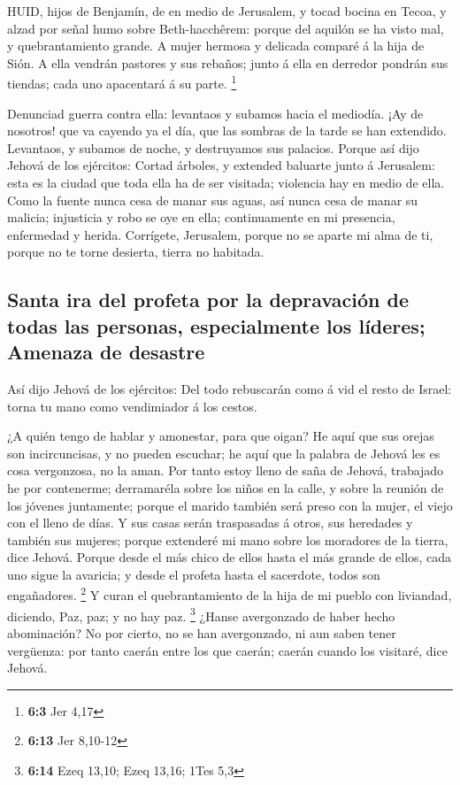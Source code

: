  HUID, hijos de Benjamín, de en medio de Jerusalem, y tocad
bocina en Tecoa, y alzad por señal humo sobre Beth-hacchêrem: porque del
aquilón se ha visto mal, y quebrantamiento grande.  A mujer
hermosa y delicada comparé á la hija de Sión.  A ella
vendrán pastores y sus rebaños; junto á ella en derredor pondrán sus
tiendas; cada uno apacentará á su parte. \footnote{\textbf{6:3} Jer 4,17}

 Denunciad guerra contra ella: levantaos y subamos hacia el
mediodía. ¡Ay de nosotros! que va cayendo ya el día, que las sombras de
la tarde se han extendido.  Levantaos, y subamos de noche, y
destruyamos sus palacios.  Porque así dijo Jehová de los
ejércitos: Cortad árboles, y extended baluarte junto á Jerusalem: esta
es la ciudad que toda ella ha de ser visitada; violencia hay en medio de
ella.  Como la fuente nunca cesa de manar sus aguas, así
nunca cesa de manar su malicia; injusticia y robo se oye en ella;
continuamente en mi presencia, enfermedad y herida. 
Corrígete, Jerusalem, porque no se aparte mi alma de ti, porque no te
torne desierta, tierra no habitada.

\hypertarget{santa-ira-del-profeta-por-la-depravaciuxf3n-de-todas-las-personas-especialmente-los-luxedderes-amenaza-de-desastre}{%
\subsection{Santa ira del profeta por la depravación de todas las
personas, especialmente los líderes; Amenaza de
desastre}\label{santa-ira-del-profeta-por-la-depravaciuxf3n-de-todas-las-personas-especialmente-los-luxedderes-amenaza-de-desastre}}

 Así dijo Jehová de los ejércitos: Del todo rebuscarán como
á vid el resto de Israel: torna tu mano como vendimiador á los cestos.

 ¿A quién tengo de hablar y amonestar, para que oigan? He
aquí que sus orejas son incircuncisas, y no pueden escuchar; he aquí que
la palabra de Jehová les es cosa vergonzosa, no la aman. 
Por tanto estoy lleno de saña de Jehová, trabajado he por contenerme;
derramaréla sobre los niños en la calle, y sobre la reunión de los
jóvenes juntamente; porque el marido también será preso con la mujer, el
viejo con el lleno de días.  Y sus casas serán traspasadas
á otros, sus heredades y también sus mujeres; porque extenderé mi mano
sobre los moradores de la tierra, dice Jehová.  Porque
desde el más chico de ellos hasta el más grande de ellos, cada uno sigue
la avaricia; y desde el profeta hasta el sacerdote, todos son
engañadores. \footnote{\textbf{6:13} Jer 8,10-12}  Y curan
el quebrantamiento de la hija de mi pueblo con liviandad, diciendo, Paz,
paz; y no hay paz. \footnote{\textbf{6:14} Ezeq 13,10; Ezeq 13,16; 1Tes
  5,3}  ¿Hanse avergonzado de haber hecho abominación? No
por cierto, no se han avergonzado, ni aun saben tener vergüenza: por
tanto caerán entre los que caerán; caerán cuando los visitaré, dice
Jehová.

